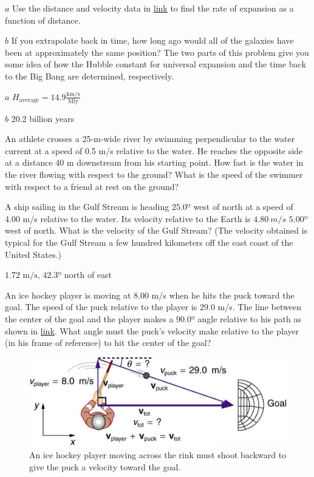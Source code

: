 \documentclass[
]{book}
\newenvironment{problems-exercises}{}{}
\begin{document}
\begin{problems-exercises}
\hypertarget{fs-id1781067}{}
\leavevmode\hypertarget{fs-id1781068}{}%
\(a\) Use the distance and velocity data in
\protect\hyperlink{import-auto-id1915192}{link} to find the rate
of expansion as a function of distance.

\(b\) If you extrapolate back in time, how long ago would all of the
galaxies have been at approximately the same position? The two parts of
this problem give you some idea of how the Hubble constant for universal
expansion and the time back to the Big Bang are determined,
respectively.

\leavevmode\hypertarget{fs-id2101167}{}%
\(a\)
\({H_{\text{average}} =}{\text{14}\text{.}\text{9}\frac{\text{km/s}}{\text{Mly}}}{}\)

\(b\) 20.2 billion years

\hypertarget{fs-id2080170}{}
\leavevmode\hypertarget{fs-id2079874}{}%
An athlete crosses a 25-m-wide river by swimming perpendicular to the
water current at a speed of 0.5 m/s relative to the water. He reaches
the opposite side at a distance 40 m downstream from his starting point.
How fast is the water in the river flowing with respect to the ground?
What is the speed of the swimmer with respect to a friend at rest on the
ground?

\hypertarget{fs-id2040310}{}
\leavevmode\hypertarget{fs-id2040311}{}%
A ship sailing in the Gulf Stream is heading \(25.0º{}\) west of north at
a speed of 4.00 m/s relative to the water. Its velocity relative to the
Earth is \(4.80\ m/s{}\) \(5.00º{}\) west of north. What is the velocity of
the Gulf Stream? (The velocity obtained is typical for the Gulf Stream a
few hundred kilometers off the east coast of the United States.)

\leavevmode\hypertarget{fs-id1820036}{}%
\({1\text{.}\text{72\ m/s}}{}\), \(42.3º{}\) north of east

\hypertarget{fs-id1769191}{}
\leavevmode\hypertarget{fs-id1769192}{}%
An ice hockey player is moving at 8.00 m/s when he hits the puck toward
the goal. The speed of the puck relative to the player is 29.0 m/s. The
line between the center of the goal and the player makes a \(90.0º{}\)
angle relative to his path as shown in
\protect\hyperlink{import-auto-id1829266}{link}. What angle must
the puck's velocity make relative to the player (in his frame of
reference) to hit the center of the goal?

\begin{figure}
\hypertarget{import-auto-id1829266}{%
\centering
\includegraphics{images/Figure_03_05_08a.jpg}
\caption{An ice hockey player moving across the rink must shoot backward to
give the puck a velocity toward the
goal.}\label{import-auto-id1829266}
}
\end{figure}


\end{problems-exercises}
\end{document}
